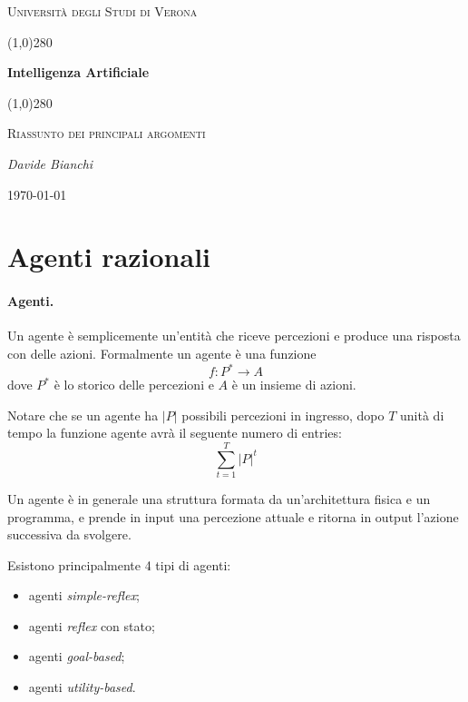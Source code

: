 \documentclass[a4paper, 11pt]{article}
\begin{document}
 \clearpage
 \begin{titlepage}
 	\centering
 	\vspace*{\fill}
 	{\scshape\LARGE Università degli Studi di Verona \par}
 	\vspace{1.5cm}
 	\line(1,0){280} \\
 	{\huge\bfseries Intelligenza Artificiale\par}
 	\line(1,0){280} \\
 	\vspace{0.5cm}
 	{\scshape\Large Riassunto dei principali argomenti\par}
 	\vspace{2cm}
 	{\Large\itshape Davide Bianchi\par}
 	\vspace{1cm}

 	\vspace{5cm}
 	\vspace*{\fill}
 	{\large \today\par}
 \end{titlepage}
 \thispagestyle{empty}
\newpage
\tableofcontents
\newpage


\section{Agenti razionali}
\paragraph{Agenti.}
Un agente è semplicemente un'entità che riceve percezioni e produce una risposta con delle azioni. Formalmente un agente è una funzione \[ f:P^\ast \to A \] dove $P^\ast$ è lo storico delle percezioni e $A$ è un insieme di azioni.

Notare che se un agente ha $\vert P \vert$ possibili percezioni in ingresso, dopo $T$ unità di tempo la funzione agente avrà il seguente numero di entries: \[ \sum_{t=1}^{T} \vert P \vert^t  \]

Un agente è in generale una struttura formata da un'architettura fisica e un programma, e prende in input una percezione attuale e ritorna in output l'azione successiva da svolgere. 

Esistono principalmente 4 tipi di agenti: \begin{itemize}
	\item agenti \textit{simple-reflex};
	\item agenti \textit{reflex} con stato;
	\item agenti \textit{goal-based};
	\item agenti \textit{utility-based}.
\end{itemize}
\end{document}
